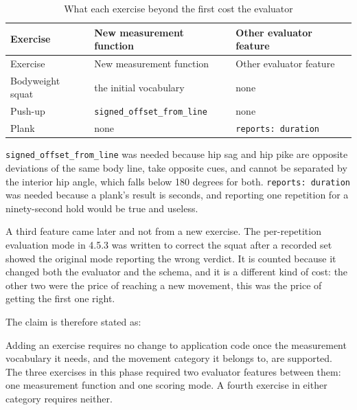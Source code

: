 {\small
\setlength{\LTpre}{6pt}\setlength{\LTpost}{8pt}
\begin{longtable}{>{\raggedright\arraybackslash}p{}>{\raggedright\arraybackslash}p{}>{\raggedright\arraybackslash}p{}}
\caption{What each exercise beyond the first cost the evaluator}\\
\toprule
Exercise & New measurement function & Other evaluator feature \\
\midrule
\endfirsthead
\toprule
Exercise & New measurement function & Other evaluator feature \\
\midrule
\endhead
\bottomrule
\endfoot
\bottomrule
\endlastfoot
Bodyweight squat & the initial vocabulary & none \\
Push-up & \texttt{signed\_\allowbreak{}offset\_\allowbreak{}from\_\allowbreak{}line} & none \\
Plank & none & \texttt{reports:\allowbreak{} duration} \\
\end{longtable}
}

\texttt{signed\_\allowbreak{}offset\_\allowbreak{}from\_\allowbreak{}line} was needed because hip sag and hip pike are opposite deviations of the same body line, take opposite cues, and cannot be separated by the interior hip angle, which falls below 180 degrees for both. \texttt{reports:\allowbreak{} duration} was needed because a plank's result is seconds, and reporting one repetition for a ninety-second hold would be true and useless.

A third feature came later and not from a new exercise. The per-repetition evaluation mode in 4.5.3 was written to correct the squat after a recorded set showed the original mode reporting the wrong verdict. It is counted because it changed both the evaluator and the schema, and it is a different kind of cost: the other two were the price of reaching a new movement, this was the price of getting the first one right.

The claim is therefore stated as:

\begin{quoteblock}
Adding an exercise requires no change to application code once the measurement vocabulary it needs, and the movement category it belongs to, are supported. The three exercises in this phase required two evaluator features between them: one measurement function and one scoring mode. A fourth exercise in either category requires neither.
\end{quoteblock}

